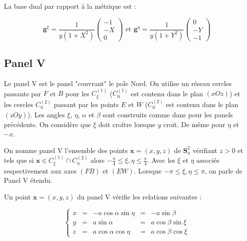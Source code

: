 La base dual par rapport à la métrique est :

\begin{equation}
\mathbf{g}^{\xi} = \dfrac{1}{y(1+X^2)}\begin{pmatrix}
-1 \\ -X \\ 0
\end{pmatrix} \text{ et } \mathbf{g}^{\eta} = \dfrac{1}{y(1+Y^2)}\begin{pmatrix}
0 \\ -Y \\ -1
\end{pmatrix}
\label{eq: base duale IV}
\end{equation}













\subsection{Panel V}

Le panel V est le panel "couvrant" le pole Nord. On utilise un réseau cercles passants par $F$ et $B$ pour les $C_{\xi}^{(1)}$ ($C_{0}^{(1)}$ est contenu dans le plan $(xOz)$) et les cercles $C_{\eta}^{(2)}$ passant par les points $E$ et $W$ ($C_{0}^{(2)}$ est contenu dans le plan $(zOy)$). Les angles $\xi$, $\eta$, $\alpha$ et $\beta$ sont construits comme dans pour les panels précédents.  On considère que $\xi$ doit croître lorsque $y$ croit. De même pour $\eta$ et $-x$.

\begin{definition}
On nomme panel V l'ensemble des points $\mathbf{x}=(x,y,z)$ de $\mathbf{S}_a^2$ vérifiant $z>0$ et tels que si $\mathbf{x} \in C_{\xi}^{(1)} \cap C_{\eta}^{(2)}$ alors $-\frac{\pi}{4}\leq \xi,\eta \leq \frac{\pi}{4}$. Avec les $\xi$ et $\eta$ associés respectivement aux axes $(FB)$ et $(EW)$.
Lorsque $-\pi \leq \xi,\eta \leq \pi$, on parle de Panel V étendu.
\end{definition}

Un point $\mathbf{x}=(x,y,z)$ du panel V vérifie les relations suivantes :

\begin{equation}
\left\lbrace
\begin{array}{rcccc}
x & = & -a \cos \alpha \sin \eta & = & - a \sin \beta \\
y & = & a \sin \alpha & = & a \cos \beta \sin \xi \\
z & = & a \cos \alpha \cos \eta & = & a \cos \beta \cos \xi
\end{array}
\right.
\end{equation}

